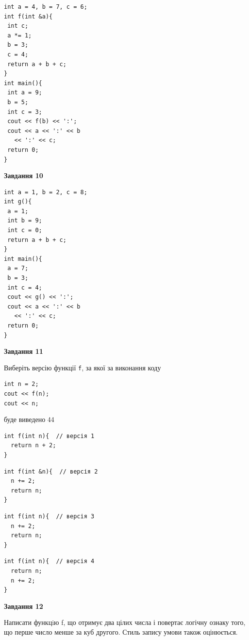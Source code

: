 \documentclass[12pt, ukrainian]{article}
\def\code#1{\Verb!#1!}
\begin{document}
{\begin {large}
\begin{minipage}[t]{7.0cm}
\begin{verbatim}
int a = 4, b = 7, c = 6;
int f(int &a){
 int c;
 a *= 1;
 b = 3;
 c = 4;
 return a + b + c;
}
int main(){
 int a = 9;
 b = 5;
 int c = 3;
 cout << f(b) << ':';
 cout << a << ':' << b 
   << ':' << c;
 return 0;
}
\end{verbatim}



\begin{center}
\textbf{Завдання 10}
\end{center}
\vspace{-8mm}

\begin{verbatim}
int a = 1, b = 2, c = 8;
int g(){
 a = 1;
 int b = 9;
 int c = 0;
 return a + b + c;
}
int main(){
 a = 7;
 b = 3;
 int c = 4;
 cout << g() << ':';
 cout << a << ':' << b 
   << ':' << c;
 return 0;
}
\end{verbatim}

\end{minipage}
\vline \hspace{1mm}
\begin{minipage}[t]{11.0cm}

\begin{center}
\textbf{Завдання 11}
\end{center}
Виберіть версію функції \code{f}, за якої за виконання коду
\begin{verbatim}
int n = 2;
cout << f(n);
cout << n;
\end{verbatim}

буде виведено 44

\begin{verbatim}
int f(int n){  // версія 1
  return n + 2;
}
\end{verbatim}

\vspace{-8mm}\begin{verbatim}
int f(int &n){  // версія 2
  n += 2;
  return n;
}
\end{verbatim}

\vspace{-8mm}\begin{verbatim}
int f(int n){  // версія 3
  n += 2;
  return n;
}
\end{verbatim}

\vspace{-8mm}\begin{verbatim}
int f(int n){  // версія 4
  return n;
  n += 2;
}
\end{verbatim}



\begin{center}
\textbf{Завдання 12}
\end{center}

Написати функцiю f, що отримує два цілих числа і повертає логічну ознаку того, що перше число менше за куб другого. Стиль запису умови також оцінюється.\par

\end{minipage}

\end {large}}
\newpage
\end{document}
